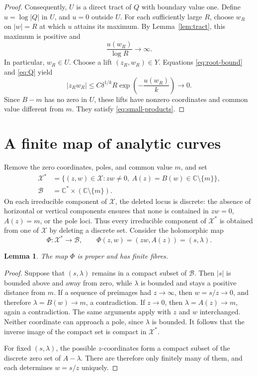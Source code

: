 \documentclass[11pt]{article}
\newtheorem{lemma}[theorem]{Lemma}
\theoremstyle{remark}
\numberwithin{equation}{section}
\newcommand{\C}{\mathbb C}
\newcommand{\X}{\mathcal X}
\newcommand{\B}{\mathcal B}
\begin{document}
\begin{proof}
Consequently, \(U\) is a direct tract of \(Q\) with boundary value
one. Define \(u=\log|Q|\) in \(U\), and \(u=0\) outside \(U\).
For each sufficiently large \(R\), choose \(w_R\) on \(|w|=R\)
at which \(u\) attains its maximum.
By Lemma~\ref{lem:tract}, this maximum is positive and
\[
 \frac{u(w_R)}{\log R}\longrightarrow\infty.
\]
In particular, \(w_R\in U\).
Choose a lift \((z_R,w_R)\in Y\). Equations
\eqref{eq:root-bound} and \eqref{eq:Q} yield
\begin{equation}\label{eq:product-decay}
 |z_Rw_R|
 \le C\delta^{1/k}R\exp\!\left(-\frac{u(w_R)}k\right)
 \longrightarrow0.
\end{equation}
Since \(B-m\) has no zero in \(U\), these lifts have nonzero
coordinates and common value different from \(m\).
They satisfy \eqref{eq:small-products}.
\end{proof}

\section{A finite map of analytic curves}\label{sec:finite}

Remove the zero coordinates, poles, and common value \(m\), and set
\begin{align*}
 \X^*&=\{(z,w)\in\X:zw\ne0,\ A(z)=B(w)\in\C\setminus\{m\}\},\\
 \B&=\C^*\times(\C\setminus\{m\}).
\end{align*}
On each irreducible component of \(\X\), the deleted locus is
discrete: the absence of horizontal or vertical components ensures that
none is contained in \(zw=0\), \(A(z)=m\), or the pole loci.
Thus every irreducible component of \(\X^*\) is obtained
from one of \(\X\) by deleting a discrete set.
Consider the holomorphic map
\begin{equation}\label{eq:Phi}
 \Phi:\X^*\longrightarrow\B,
 \qquad \Phi(z,w)=(zw,A(z))=(s,\lambda).
\end{equation}

\begin{lemma}\label{lem:proper}
The map \(\Phi\) is proper and has finite fibres.
\end{lemma}

\begin{proof}
Suppose that \((s,\lambda)\) remains in a compact subset of \(\B\).
Then \(|s|\) is bounded above and away from zero, while \(\lambda\)
is bounded and stays a positive distance from \(m\).
If a sequence of preimages had \(z\to\infty\), then
\(w=s/z\to0\), and therefore \(\lambda=B(w)\to m\), a contradiction.
If \(z\to0\), then \(\lambda=A(z)\to m\), again a contradiction.
The same arguments apply with \(z\) and \(w\) interchanged.
Neither coordinate can approach a pole, since \(\lambda\) is bounded.
It follows that the inverse image of the compact set is compact in
\(\X^*\).

For fixed \((s,\lambda)\), the possible \(z\)-coordinates form a
compact subset of the discrete zero set of \(A-\lambda\).
There are therefore only finitely many of them, and each determines
\(w=s/z\) uniquely.
\end{proof}
\end{document}
